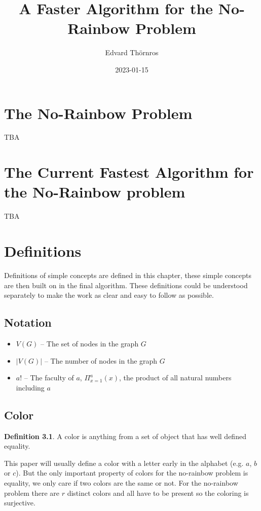 \documentclass{book}
\title{A Faster Algorithm for the No-Rainbow Problem}
\author{Edvard Thörnros}
\date{2023-01-15}
\theoremstyle{definition}
\newtheorem{definition}{Definition}[section]
\begin{document}
\maketitle

\tableofcontents




\chapter{The No-Rainbow Problem}
TBA

\chapter{The Current Fastest Algorithm for the No-Rainbow problem}
TBA

\chapter{Definitions}
Definitions of simple concepts are defined in this chapter, these simple concepts are then built on in the final algorithm. These definitions could be understood separately to make the work as clear and easy to follow as possible.

\section{Notation}
\begin{itemize}
  \item $V(G)$ -- The set of nodes in the graph $G$ 
  \item $|V(G)|$ -- The number of nodes in the graph $G$ 
  \item $a!$ -- The faculty of $a$, $\Pi_{x=1}^a(x)$, the product of all natural numbers including $a$
\end{itemize}

\section{Color}
\begin{definition}
  A color is anything from a set of object that has well defined equality.
\end{definition}
This paper will usually define a color with a letter early in the alphabet (e.g. $a$, $b$ or $c$). But the only important property of colors for the no-rainbow problem is equality, we only care if two colors are the same or not. For the no-rainbow problem there are $r$ distinct colors and all have to be present so the coloring is surjective.
\end{document}
